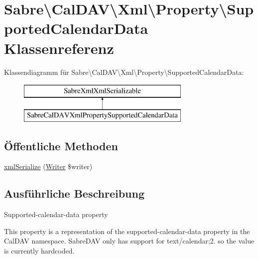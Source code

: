 \hypertarget{class_sabre_1_1_cal_d_a_v_1_1_xml_1_1_property_1_1_supported_calendar_data}{}\section{Sabre\textbackslash{}Cal\+D\+AV\textbackslash{}Xml\textbackslash{}Property\textbackslash{}Supported\+Calendar\+Data Klassenreferenz}
\label{class_sabre_1_1_cal_d_a_v_1_1_xml_1_1_property_1_1_supported_calendar_data}
Klassendiagramm für Sabre\textbackslash{}Cal\+D\+AV\textbackslash{}Xml\textbackslash{}Property\textbackslash{}Supported\+Calendar\+Data\+:\begin{figure}[H]
\begin{center}
\leavevmode
\includegraphics[height=2.000000cm]{class_sabre_1_1_cal_d_a_v_1_1_xml_1_1_property_1_1_supported_calendar_data}
\end{center}
\end{figure}
\subsection*{Öffentliche Methoden}
\begin{DoxyCompactItemize}
\item 
\mbox{\hyperlink{class_sabre_1_1_cal_d_a_v_1_1_xml_1_1_property_1_1_supported_calendar_data_a4458e6241019a0b31e1c81b76cf5d740}{xml\+Serialize}} (\mbox{\hyperlink{class_sabre_1_1_xml_1_1_writer}{Writer}} \$writer)
\end{DoxyCompactItemize}


\subsection{Ausführliche Beschreibung}
Supported-\/calendar-\/data property

This property is a representation of the supported-\/calendar-\/data property in the Cal\+D\+AV namespace. Sabre\+D\+AV only has support for text/calendar;2. so the value is currently hardcoded.


